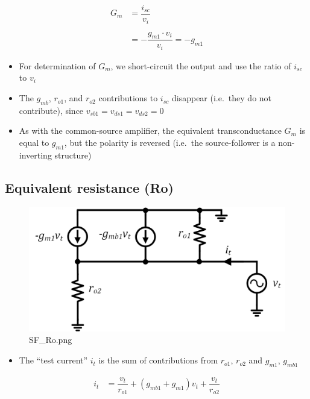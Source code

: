 \documentclass[11pt]{article}
\providecommand{\tightlist}{%
      \setlength{\itemsep}{0pt}\setlength{\parskip}{0pt}}
\begin{document}
    \begin{align}
G_m &= \dfrac{i_{sc}}{v_i}\\
\\
&= -\dfrac{g_{m1}\cdot v_i}{v_i} = \boxed{ -g_{m1} }
\end{align}

    \begin{itemize}
\tightlist
\item
  For determination of \(G_m\), we short-circuit the output and use the
  ratio of \(i_{sc}\) to \(v_i\)
\item
  The \(g_{mb}\), \(r_{o1}\), and \(r_{o2}\) contributions to \(i_{sc}\)
  disappear (i.e.~they do not contribute), since
  \(v_{sb1} = v_{ds1} = v_{ds2} = 0\)
\item
  As with the common-source amplifier, the equivalent transconductance
  \(G_m\) is equal to \(g_{m1}\), but the polarity is reversed (i.e.~the
  source-follower is a non-inverting structure)
\end{itemize}

    \hypertarget{equivalent-resistance-ro}{%
\subsection{Equivalent resistance (Ro)}\label{equivalent-resistance-ro}}

    \begin{figure}
\centering
\includegraphics{SF_Ro.png}
\caption{SF\_Ro.png}
\end{figure}

    \begin{itemize}
\tightlist
\item
  The ``test current'' \(i_t\) is the sum of contributions from
  \(r_{o1}\), \(r_{o2}\) and \(g_{m1}\), \(g_{mb1}\)
\end{itemize}

\begin{align}
i_t &= \dfrac{v_t}{r_{o1}} + (g_{mb1} + g_{m1})v_t + \dfrac{v_t}{r_{o2}}\\
\end{align}
\end{document}

